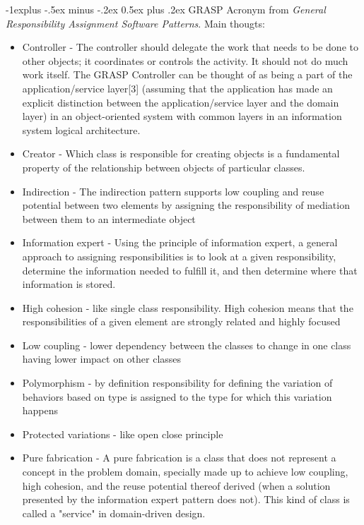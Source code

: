 \documentclass[10pt,landscape]{article}
\makeatletter
\renewcommand{\subsection}{\@startsection{subsection}{2}{0mm}%
                                {-1explus -.5ex minus -.2ex}%
                                {0.5ex plus .2ex}%
                                {\normalfont\normalsize\bfseries}}
\makeatother
\begin{document}
\begin{multicols}{3}
\subsection{GRASP}
Acronym from \textit{General Responsibility Assignment Software Patterns}. Main thougts:
\begin{itemize}
\item Controller - The controller should delegate the work that needs to be done to other objects; it coordinates or controls the activity. It should not do much work itself. The GRASP Controller can be thought of as being a part of the application/service layer[3] (assuming that the application has made an explicit distinction between the application/service layer and the domain layer) in an object-oriented system with common layers in an information system logical architecture. 
\item Creator - Which class is responsible for creating objects is a fundamental property of the relationship between objects of particular classes. 
\item Indirection - The indirection pattern supports low coupling and reuse potential between two elements by assigning the responsibility of mediation between them to an intermediate object
\item Information expert - Using the principle of information expert, a general approach to assigning responsibilities is to look at a given responsibility, determine the information needed to fulfill it, and then determine where that information is stored. 
\item High cohesion - like single class responsibility. High cohesion means that the responsibilities of a given element are strongly related and highly focused
\item Low coupling - lower dependency between the classes to change in one class having lower impact on other classes 
\item Polymorphism - by definition responsibility for defining the variation of behaviors based on type is assigned to the type for which this variation happens
\item Protected variations - like open close principle
\item Pure fabrication - A pure fabrication is a class that does not represent a concept in the problem domain, specially made up to achieve low coupling, high cohesion, and the reuse potential thereof derived (when a solution presented by the information expert pattern does not). This kind of class is called a "service" in domain-driven design.


\end{itemize}
\end{multicols}
\end{document}
